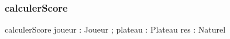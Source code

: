 \subsubsection{calculerScore}

\begin{algorithme}
\small
\fonction
{calculerScore}
{joueur : Joueur ; plateau : Plateau}
{\naturel}
{res : Naturel}
{
{}
}
\end{algorithme}